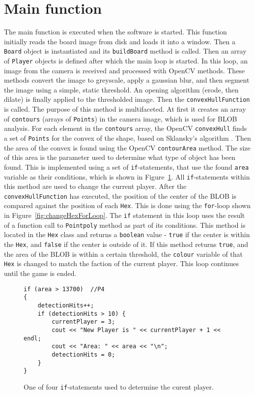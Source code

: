\section{Main function}
The main function is executed when the software is started. This function initially reads the board image from disk and loads it into a window. Then a \texttt{Board} object is instantiated and its \texttt{buildBoard} method is called. Then an array of \texttt{Player} objects is defined after which the main loop is started. In this loop, an image from the camera is received and processed with OpenCV methods. These methods convert the image to greyscale, apply a gaussian blur, and then segment the image using a simple, static threshold. An opening algorithm (erode, then dilate) is finally applied to the thresholded image. Then the \texttt{convexHullFunction} is called. The purpose of this method is multifaceted. At first it creates an array of \texttt{contours} (arrays of \texttt{Points}) in the camera image, which is used for BLOB analysis. For each element in the \texttt{contours} array, the OpenCV \texttt{convexHull} finds a set of \texttt{Points} for the convex of the shape, based on Sklansky's algorithm \citep{Sklansky198279}. Then the area of the convex is found using the OpenCV \texttt{contourArea} method. The size of this area is the parameter used to determine what type of object has been found. This is implemented using a set of \texttt{if}-statements, that use the found \texttt{area} variable as their conditions, which is shown in Figure~\ref{fig:currentPlayerIf}. All \texttt{if}-statements within this method are used to change the current player. After the \texttt{convexHullFunction} has executed, the position of the center of the BLOB is compared against the position of each \texttt{Hex}. This is done using the \texttt{for}-loop shown in Figure~\ref{fig:changeHexForLoop}. The \texttt{if} statement in this loop uses the result of a function call to \texttt{Pointpoly} method as part of its conditions. This method is located in the \texttt{Hex} class and returns a \texttt{boolean} value - \texttt{true} if the center is within the \texttt{Hex}, and \texttt{false} if the center is outside of it. If this method returns \texttt{true}, and the area of the BLOB is within a certain threshold, the \texttt{colour} variable of that \texttt{Hex} is changed to match the faction of the current player. This loop continues until the game is ended.

\begin{figure}
\begin{lstlisting}
if (area > 13700)  //P4
{
	detectionHits++;
	if (detectionHits > 10) {
		currentPlayer = 3;
		cout << "New Player is " << currentPlayer + 1 << endl;
		cout << "Area: " << area << "\n";
		detectionHits = 0;
	}
}
\end{lstlisting}
\caption{One of four \texttt{if}-statements used to determine the curent player. \label{fig:currentPlayerIf}}
\end{figure}


